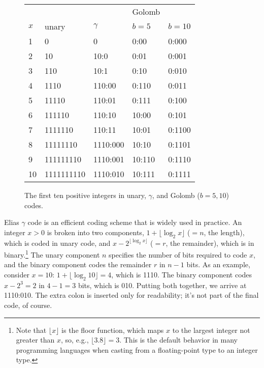 \begin{figure}[t]
\centering
\begin{tabular}{lllll}
\hline
    &       &          & Golomb \\
$x$ & unary & $\gamma$ & $b=5$ & $b=10$\\
\hline
1  & 0          & 0        & 0:00   & 0:000\\
2  & 10         & 10:0     & 0:01   & 0:001\\
3  & 110        & 10:1     & 0:10   & 0:010\\
4  & 1110       & 110:00   & 0:110  & 0:011\\
5  & 11110      & 110:01   & 0:111  & 0:100\\
6  & 111110     & 110:10   & 10:00  & 0:101\\
7  & 1111110    & 110:11   & 10:01  & 0:1100\\
8  & 11111110   & 1110:000 & 10:10  & 0:1101\\
9  & 111111110  & 1110:001 & 10:110 & 0:1110\\
10 & 1111111110 & 1110:010 & 10:111 & 0:1111\\
\hline
\end{tabular}
\caption{The first ten positive integers in unary, $\gamma$, and
  Golomb ($b=5,10$) codes.}
\label{chapter-indexing:encoding-schemes}
\end{figure}

Elias $\gamma$ code is an efficient coding scheme that is widely used
in practice.  An integer $x>0$ is broken into two components, $1 +
\lfloor \log_2 x \rfloor$ ($=n$, the length), which is coded in unary
code, and $x-2^{\lfloor \log_2 x \rfloor}$ ($=r$, the remainder),
which is in binary.\footnote{Note that $\lfloor x \rfloor$ is the
  floor function, which maps $x$ to the largest integer not greater
  than $x$, so, e.g., $\lfloor 3.8 \rfloor = 3$. This is the default
  behavior in many programming languages when casting from a
  floating-point type to an integer type.}  The unary component $n$
specifies the number of bits required to code $x$, and the binary
component codes the remainder $r$ in $n-1$ bits.  As an example,
consider $x=10$: $1 + \lfloor \log_2 10 \rfloor = 4$, which is 1110.
The binary component codes $x-2^3=2$ in $4-1=3$ bits, which is 010.
Putting both together, we arrive at 1110:010. The extra colon is
inserted only for readability; it's not part of the final code, of
course.


